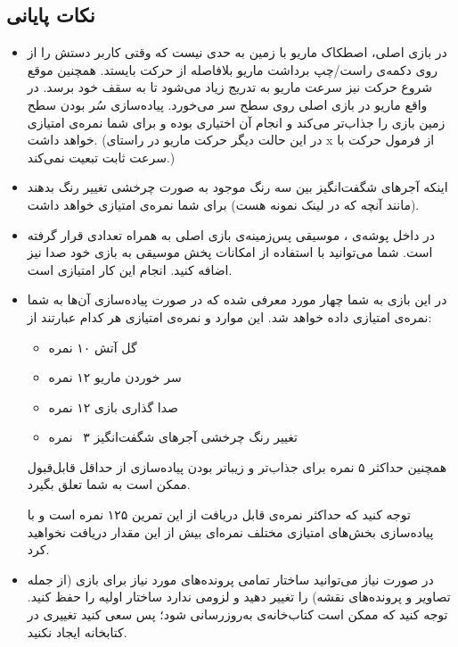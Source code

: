 \documentclass{utap}
\begin{document}
	\subsection{نکات پایانی}
	\begin{itemize}
		\item
در بازی اصلی، اصطکاک ماریو با زمین به حدی نیست که وقتی کاربر دستش را از روی دکمه‌ی راست/چپ برداشت ماریو بلافاصله از حرکت بایستد. همچنین موقع شروع حرکت نیز سرعت ماریو به تدریج زیاد می‌شود تا به سقف خود برسد. در واقع ماریو در بازی اصلی روی سطح سر می‌خورد. پیاده‌سازی سُر بودن سطح زمین بازی را جذاب‌تر می‌کند و انجام آن اختیاری بوده و برای شما نمره‌ی امتیازی خواهد داشت. (در این حالت دیگر حرکت ماریو در راستای x از فرمول حرکت با سرعت ثابت تبعیت نمی‌کند.)
		\item
اینکه آجر‌های شگفت‌انگیز بین سه رنگ موجود به صورت چرخشی تغییر رنگ بدهند (مانند آنچه که در لینک نمونه هست) برای شما نمره‌ی امتیازی خواهد داشت.
	\item
	در داخل پوشه‌ی ، موسیقی پس‌زمینه‌ی بازی اصلی به همراه تعدادی  قرار گرفته است. شما می‌توانید با استفاده از امکانات پخش موسیقی  به بازی خود صدا نیز اضافه کنید. انجام این کار امتیازی است.
	\item
	در این بازی به شما چهار مورد معرفی شده که در صورت پیاده‌سازی آن‌ها به شما نمره‌ی امتیازی داده خواهد شد. این موارد و نمره‌ی امتیازی هر کدام عبارتند از:
    \begin{itemize}
\item گل آتش \dotfill ۱۰ نمره
\item سر خوردن ماریو \dotfill ۱۲ نمره
\item صدا گذاری بازی \dotfill ۱۲ نمره
\item تغییر رنگ چرخشی آجر‌های شگفت‌انگیز \dotfill ۳~ نمره
    \end{itemize}
همچنین حداکثر ۵ نمره برای جذاب‌تر و زیباتر بودن پیاده‌سازی از حداقل قابل‌قبول ممکن است به شما تعلق بگیرد.

توجه کنید که حداکثر نمره‌ی قابل دریافت از این تمرین ۱۲۵ نمره است و با پیاده‌سازی بخش‌های امتیازی مختلف نمره‌ای بیش از این مقدار دریافت نخواهید کرد.
		\item
در صورت نیاز می‌توانید ساختار تمامی پرونده‌های مورد نیاز برای بازی (از جمله تصاویر و پرونده‌های نقشه) را تغییر دهید و لزومی ندارد ساختار اولیه را حفظ کنید.
توجه کنید که ممکن است کتاب‌خانه‌ی  به‌روزرسانی شود؛ پس سعی کنید تغییری در کتابخانه ایجاد نکنید.
	
	\end{itemize}
\end{document}
